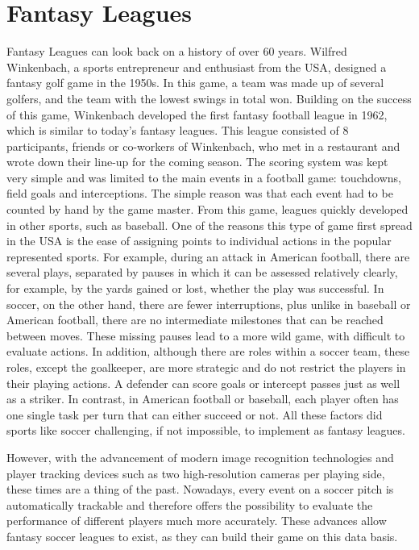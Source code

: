 \section{Fantasy Leagues}

Fantasy Leagues can look back on a history of over 60 years. Wilfred Winkenbach, a sports entrepreneur and enthusiast from the USA, designed a fantasy golf game in the 1950s. In this game, a team was made up of several golfers, and the team with the lowest swings in total won. Building on the success of this game, Winkenbach developed the first fantasy football league in 1962, which is similar to today's fantasy leagues. \parencite[cf.][]{green_wink_2014} This league consisted of 8 participants, friends or co-workers of Winkenbach, who met in a restaurant and wrote down their line-up for the coming season. The scoring system was kept very simple and was limited to the main events in a football game: touchdowns, field goals and interceptions. The simple reason was that each event had to be counted by hand by the game master. \parencite[cf.][]{fabiano_fantasy_2007} From this game, leagues quickly developed in other sports, such as baseball. One of the reasons this type of game first spread in the USA is the ease of assigning points to individual actions in the popular represented sports. For example, during an attack in American football, there are several plays, separated by pauses in which it can be assessed relatively clearly, for example, by the yards gained or lost, whether the play was successful. In soccer, on the other hand, there are fewer interruptions, plus unlike in baseball or American football, there are no intermediate milestones that can be reached between moves. These missing pauses lead to a more wild game, with difficult to evaluate actions. In addition, although there are roles within a soccer team, these roles, except the goalkeeper, are more strategic and do not restrict the players in their playing actions. A defender can score goals or intercept passes just as well as a striker. In contrast, in American football or baseball, each player often has one single task per turn that can either succeed or not. All these factors did sports like soccer challenging, if not impossible, to implement as fantasy leagues.

However, with the advancement of modern image recognition technologies and player tracking devices such as two high-resolution cameras per playing side, these times are a thing of the past. \parencite[cf.][]{hoffmann_millionen_2014} Nowadays, every event on a soccer pitch is automatically trackable and therefore offers the possibility to evaluate the performance of different players much more accurately. These advances allow fantasy soccer leagues to exist, as they can build their game on this data basis.


